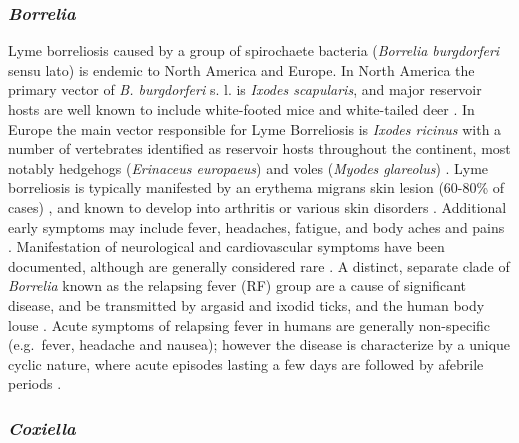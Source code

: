 \documentclass[a4paper, nobind]{templates/ociamthesis}
\begin{document}
\hypertarget{borrelia}{%
\subsubsection{\texorpdfstring{\emph{Borrelia}}{Borrelia}}\label{borrelia}}

Lyme borreliosis caused by a group of spirochaete bacteria (\emph{Borrelia burgdorferi} sensu lato) is endemic to North America and Europe.
In North America the primary vector of \emph{B. burgdorferi} s. l. is \emph{Ixodes scapularis}, and major reservoir hosts are well known to include white-footed mice and white-tailed deer \autocite{halseyRoleIxodesScapularis2018}.
In Europe the main vector responsible for Lyme Borreliosis is \emph{Ixodes ricinus} \autocite{kirsteinLocalVariationsDistribution1997} with a number of vertebrates identified as reservoir hosts throughout the continent, most notably hedgehogs (\emph{Erinaceus europaeus}) and voles (\emph{Myodes glareolus}) \autocite{jahfariMeltingPotTickborne2017,coipanGeneticDiversityBorrelia2018,estrada-penaHighThroughputSequencing2018}.
Lyme borreliosis is typically manifested by an erythema migrans skin lesion (60-80\% of cases) \autocite{rizzoliLymeBorreliosisEurope2011}, and known to develop into arthritis or various skin disorders \autocite{stanekLymeBorreliosis2012}.
Additional early symptoms may include fever, headaches, fatigue, and body aches and pains \autocite{rizzoliLymeBorreliosisEurope2011,clarkLymeBorreliosisHuman2013}.
Manifestation of neurological and cardiovascular symptoms have been documented, although are generally considered rare \autocite{clarkLymeBorreliosisHuman2013}.
A distinct, separate clade of \emph{Borrelia} known as the relapsing fever (RF) group are a cause of significant disease, and be transmitted by argasid and ixodid ticks, and the human body louse \autocite{lopezTickBorneRelapsingFever2016}.
Acute symptoms of relapsing fever in humans are generally non-specific (e.g.~fever, headache and nausea); however the disease is characterize by a unique cyclic nature, where acute episodes lasting a few days are followed by afebrile periods \autocite{dworkinTickborneRelapsingFever2008}.

\hypertarget{coxiella}{%
\subsubsection{\texorpdfstring{\emph{Coxiella}}{Coxiella}}\label{coxiella}}
\end{document}
